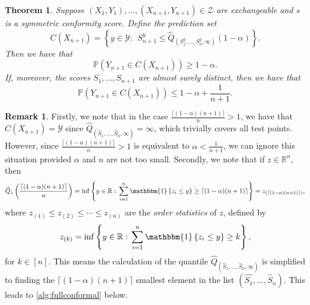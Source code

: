 \documentclass[11pt, titlepage]{article} %
\newcommand{\Prob}[1]{\mathbb{P}\left( #1 \right)}
\newcommand{\Ind}[1]{\mathbbm{1}\left\{ #1 \right\}}
\numberwithin{equation}{section}
\newtheorem{theorem}{Theorem}
\theoremstyle{definition}
\newtheorem{remark}{Remark}
\numberwithin{theorem}{section}
\numberwithin{lemma}{section}
\numberwithin{corollary}{section}
\numberwithin{proposition}{section}
\numberwithin{definition}{section}
\numberwithin{remark}{section}
\begin{document}
\begin{theorem}
    Suppose \((X_1, Y_1), \ldots, (X_{n+1}, Y_{n+1}) \in \mathcal{Z}\) are exchangeable and \(s\) is a symmetric conformity score. Define the prediction set \begin{equation}
        C(X_{n+1}) = \left\{ y \in \mathcal{Y}: \ \ S_{n+1}^y \leq \hat{Q}_{(S_1^y, \ldots, S_n^y, \infty)}(1-\alpha)  \right\}.
    \label{eqn:fullconformal_prediction_set_v2}
    \end{equation} Then we have that \[\Prob{Y_{n+1} \in C(X_{n+1})} \geq 1-\alpha.\] If, moreover, the scores \(S_1, \ldots, S_{n+1}\) are almost surely distinct, then we have that \[\Prob{Y_{n+1} \in C(X_{n+1})} \leq 1-\alpha + \frac{1}{n+1}.\]

\label{thm:fullconformal_coverage_v2}  
\end{theorem}


\begin{remark}
    Firstly, we note that in the case \(\frac{\lceil (1-\alpha)(n+1) \rceil}{n} > 1\), we have that \(C(X_{n+1}) = \mathcal{Y}\) since \(\hat{Q}_{(\hat{S}_1, \ldots, \hat{S}_n, \infty)} = \infty\), which trivially covers all test points. However, since \(\frac{\lceil (1-\alpha)(n+1) \rceil}{n} > 1\) is equivalent to \(\alpha < \frac{1}{n+1}\), we can ignore this situation provided \(\alpha\) and \(n\) are not too small. Secondly, we note that if \(z \in \mathbb{R}^n\), then \begin{align*}
        \hat{Q}_z\left( \frac{\lceil (1-\alpha)(n+1) \rceil}{n} \right) = \inf \left\{ y \in \mathbb{R}: \, \sum_{i=1}^{n} \Ind{z_i \leq y} \geq \lceil (1-\alpha)(n+1) \rceil \right\} =  z_{(\lceil (1-\alpha)(n+1) \rceil)}, 
    \end{align*} where \(z_{(1)} \leq z_{(2)} \leq \cdots \leq z_{(n)}\) are the \textit{order statistics} of \(z\), defined by \[z_{(k)} = \inf \left\{ y \in \mathbb{R}: \, \sum_{i=1}^{n} \Ind{z_i \leq y} \geq k \right\},\] for \(k \in [n]\). This means the calculation of the quantile \(\hat{Q}_{(\hat{S}_1, \ldots, \hat{S}_n, \infty)}\) is simplified to finding the \(\lceil (1-\alpha)(n+1) \rceil\) smallest element in the list \((\hat{S_1}, \ldots, \hat{S}_n)\). This leads to \cref{alg:fullconformal} below.
\end{remark}
\end{document}

